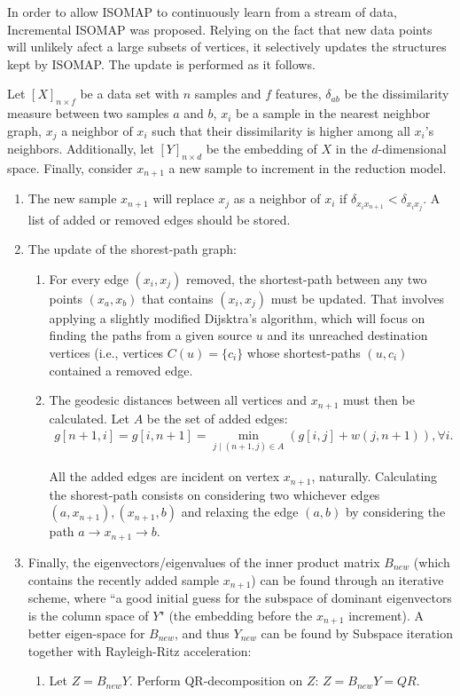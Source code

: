 \documentclass[12pt]{report}
\begin{document}
In order to allow ISOMAP to continuously learn from a stream of data, Incremental ISOMAP was proposed. \cite{law2006incremental} Relying on the fact that new data points will unlikely afect a large subsets of vertices, it selectively updates the structures kept by ISOMAP. The update is performed as it follows.

Let $[X]_{n \times f}$ be a data set with $n$ samples and $f$ features, $\delta_{ab}$ be the dissimilarity measure between two samples $a$ and $b$, $x_i$ be a sample in the nearest neighbor graph, $x_j$ a neighbor of $x_i$ such that their dissimilarity is higher among all $x_i$'s neighbors. Additionally, let $[Y]_{n \times d}$ be the embedding of $X$ in the $d$-dimensional space. Finally, consider $x_{n+1}$ a new sample to increment in the reduction model.

\begin{enumerate}
	\item The new sample $x_{n+1}$ will replace $x_j$ as a neighbor of $x_i$ if $\delta_{x_ix_{n+1}} < \delta_{x_ix_j}$. A list of added or removed edges should be stored.
	
	\item The update of the shorest-path graph:
	\begin{enumerate}
		\item For every edge $(x_i, x_j)$ removed, the shortest-path between any two points $(x_a, x_b)$ that contains $(x_i, x_j)$ must be updated. That involves applying a slightly modified Dijsktra's algorithm, which will focus on finding the paths from a given source $u$ and its unreached destination vertices (i.e., vertices $C(u)=\{c_i\}$ whose  shortest-paths $(u, c_i)$ contained a removed edge.
		
		\item The geodesic distances between all vertices and $x_{n+1}$ must then be calculated. Let $A$ be the set of added edges:
		\begin{align*}
			g[n+1, i] = g[i, n+1] = \min_{j \mid (n+1, j) \in A} (g[i, j]+w(j, n+1)),\forall i.
		\end{align*}
		
		All the added edges are incident on vertex $x_{n+1}$, naturally.  Calculating the shorest-path consists on considering two whichever edges $(a, x_{n+1}), (x_{n+1}, b)$ and relaxing the edge $(a, b)$ by considering the path $a \to x_{n+1} \to b$.
	\end{enumerate}
	
	\item Finally, the eigenvectors/eigenvalues of the inner product matrix $B_{new}$ (which contains the recently added sample $x_{n+1}$) can be found through an iterative scheme, where ``a good initial guess for the subspace of dominant eigenvectors is the column space of $Y$" \cite{law2006incremental} (the embedding before the $x_{n+1}$ increment).
	A better eigen-space for $B_{new}$, and thus $Y_{new}$ can be found by Subspace iteration together with Rayleigh-Ritz acceleration: \cite{law2006incremental} 
	\begin{enumerate}
		\item Let $Z = B_{new}Y$. Perform QR-decomposition on $Z$: $Z = B_{new}Y = QR$.
		

\end{enumerate}
\end{enumerate}
\end{document}

